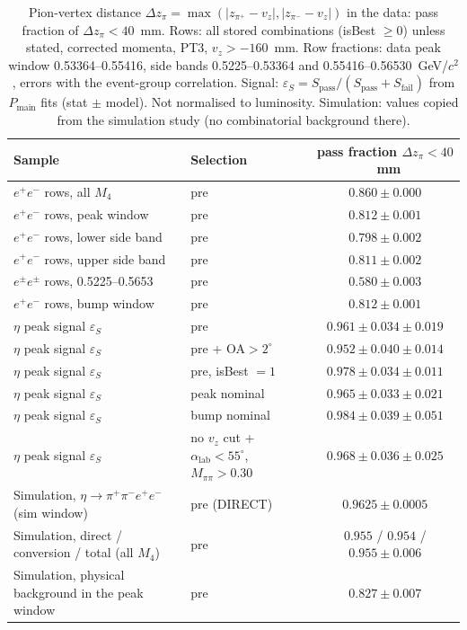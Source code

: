 \begin{table}[H]
\centering\small
\setlength{\tabcolsep}{4pt}
\caption{Pion-vertex distance $\Delta z_\pi=\max(|z_{\pi^+}-v_z|,|z_{\pi^-}-v_z|)$ in the data: pass fraction of $\Delta z_\pi<40$~mm. Rows: all stored combinations (isBest $\geq 0$) unless stated, corrected momenta, PT3, $v_z>-160$~mm. Row fractions: data peak window 0.53364--0.55416, side bands 0.5225--0.53364 and 0.55416--0.56530~GeV/$c^2$, errors with the event-group correlation. Signal: $\varepsilon_S=S_\mathrm{pass}/(S_\mathrm{pass}+S_\mathrm{fail})$ from $P_\mathrm{main}$ fits (stat $\pm$ model). Not normalised to luminosity. Simulation: values copied from the simulation study (no combinatorial background there).}
\label{tab:prep_dzpi}
\begin{tabular}{llc}
\toprule
Sample & Selection & pass fraction $\Delta z_\pi<40$~mm \\
\midrule
$e^+e^-$ rows, all $M_4$ & pre & $0.860\pm0.000$ \\
$e^+e^-$ rows, peak window & pre & $0.812\pm0.001$ \\
$e^+e^-$ rows, lower side band & pre & $0.798\pm0.002$ \\
$e^+e^-$ rows, upper side band & pre & $0.811\pm0.002$ \\
$e^\pm e^\pm$ rows, 0.5225--0.5653 & pre & $0.580\pm0.003$ \\
$e^+e^-$ rows, bump window & pre & $0.812\pm0.001$ \\
\midrule
$\eta$ peak signal $\varepsilon_S$ & pre & $0.961\pm0.034\pm0.019$ \\
$\eta$ peak signal $\varepsilon_S$ & pre + OA$>2^\circ$ & $0.952\pm0.040\pm0.014$ \\
$\eta$ peak signal $\varepsilon_S$ & pre, isBest $=1$ & $0.978\pm0.034\pm0.011$ \\
$\eta$ peak signal $\varepsilon_S$ & peak nominal & $0.965\pm0.033\pm0.021$ \\
$\eta$ peak signal $\varepsilon_S$ & bump nominal & $0.984\pm0.039\pm0.051$ \\
$\eta$ peak signal $\varepsilon_S$ & no $v_z$ cut + $\alpha_\mathrm{lab}<55^\circ$, $M_{\pi\pi}>0.30$ & $0.968\pm0.036\pm0.025$ \\
\midrule
Simulation, $\eta\to\pi^+\pi^-e^+e^-$ (sim window) & pre (DIRECT) & $0.9625\pm0.0005$ \\
Simulation, direct / conversion / total (all $M_4$) & pre & $0.955$ / $0.954$ / $0.955\pm0.006$ \\
Simulation, physical background in the peak window & pre & $0.827\pm0.007$ \\
\bottomrule
\end{tabular}
\end{table}
